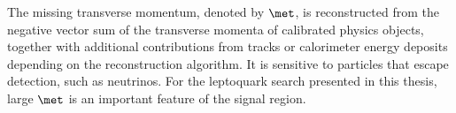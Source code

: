 
The missing transverse momentum, denoted by $\met$, is reconstructed from the negative vector sum of the transverse momenta of calibrated physics objects, together with additional contributions from tracks or calorimeter energy deposits depending on the reconstruction algorithm. 
It is sensitive to particles that escape detection, such as neutrinos. 
For the leptoquark search presented in this thesis, large $\met$ is an important feature of the signal region.
